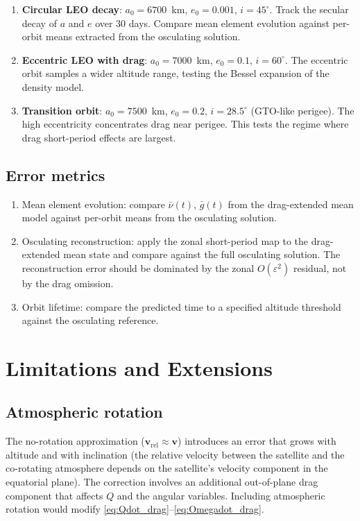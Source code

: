 \documentclass[11pt]{article}
\newcommand{\eps}{\varepsilon}
\begin{document}
\begin{enumerate}
\item \textbf{Circular LEO decay}: $a_0 = 6700$~km, $e_0 = 0.001$,
$i = 45^\circ$. Track the secular decay of $a$ and $e$ over 30 days.
Compare mean element evolution against per-orbit means extracted from the
osculating solution.

\item \textbf{Eccentric LEO with drag}: $a_0 = 7000$~km, $e_0 = 0.1$,
$i = 60^\circ$. The eccentric orbit samples a wider altitude range, testing
the Bessel expansion of the density model.

\item \textbf{Transition orbit}: $a_0 = 7500$~km, $e_0 = 0.2$,
$i = 28.5^\circ$ (GTO-like perigee). The high eccentricity concentrates drag
near perigee. This tests the regime where drag short-period effects are
largest.
\end{enumerate}

\subsection{Error metrics}

\begin{enumerate}
\item Mean element evolution: compare $\bar\nu(t)$, $\bar g(t)$ from the
drag-extended mean model against per-orbit means from the osculating
solution.

\item Osculating reconstruction: apply the zonal short-period map to the
drag-extended mean state and compare against the full osculating solution.
The reconstruction error should be dominated by the zonal $O(\eps^2)$
residual, not by the drag omission.

\item Orbit lifetime: compare the predicted time to a specified altitude
threshold against the osculating reference.
\end{enumerate}


\section{Limitations and Extensions}

\subsection{Atmospheric rotation}

The no-rotation approximation ($\bm v_{\mathrm{rel}} \approx \bm v$)
introduces an error that grows with altitude and with inclination (the
relative velocity between the satellite and the co-rotating atmosphere
depends on the satellite's velocity component in the equatorial plane).
The correction involves an additional out-of-plane drag component that
affects $Q$ and the angular variables. Including atmospheric rotation
would modify \eqref{eq:Qdot_drag}--\eqref{eq:Omegadot_drag}.
\end{document}
